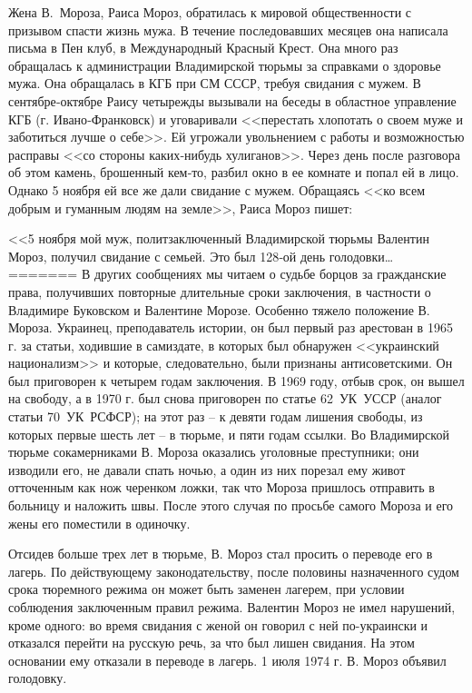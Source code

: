 \documentclass{book}
\begin{document}
Жена В.~Мороза, Раиса Мороз, обратилась к мировой общественности с призывом спасти жизнь мужа. В течение последовавших месяцев она написала письма в Пен клуб, в Международный Красный Крест. Она много раз обращалась к администрации Владимирской тюрьмы за справками о здоровье мужа. Она обращалась в КГБ при СМ СССР, требуя свидания с мужем. В сентябре‑октябре Раису четырежды вызывали на бесе­ды в областное управление КГБ (г. Ивано‑Франковск) и уговаривали <<перестать хлопотать о своем муже и заботиться лучше о себе>>. Ей угрожали увольнением с работы и возможностью расправы <<со стороны каких‑нибудь хулиганов>>. Через день после разговора об этом камень, брошенный кем‑то, разбил окно в ее комнате и попал ей в лицо. Однако 5 ноября ей все же дали свидание с мужем. Обращаясь <<ко всем добрым и гуманным людям на земле>>, Раиса Мороз пишет:

<<5 ноября мой муж, политзаключенный Владимирской тюрьмы Валентин Мороз, получил свидание с семьей. Это был 128‑ой день голодовки\ldots
=======
В других сообщениях мы читаем о судьбе борцов за гражданские права, получивших повторные длительные сроки заключения, в частности о Владимире Буковском и Валентине Морозе. Особенно тяжело положение В. Мороза. Украинец, преподаватель истории, он был первый раз арестован в 1965 г. за статьи, ходившие в самиздате, в которых был обнаружен <<украинский национализм>> и которые, следовательно, были признаны антисоветскими. Он был приговорен к четырем годам заключения. В 1969 году, отбыв срок, он вышел на свободу, а в 1970 г. был снова приговорен по статье 62~УК~УССР (аналог статьи 70~УК~РСФСР); на этот раз -- к девяти годам лишения свободы, из которых первые шесть лет -- в тюрьме, и пяти годам ссылки. Во Владимирской тюрьме сокамерниками В. Мо­роза оказались уголовные преступники; они изводили его, не давали спать ночью, а один из них порезал ему живот отточенным как нож черенком ложки, так что Мороза пришлось отпра­вить в больницу и наложить швы. После этого случая по просьбе самого Мороза и его жены его поместили в 
одиночку.

Отсидев больше трех лет в тюрьме, В. Мороз стал просить о переводе его в лагерь. По действующему законодательству, после половины назначенного судом срока тюремного режима он может быть заменен лагерем, при условии соблюдения заключенным правил режима. Валентин Мороз не имел нарушений, кроме одного: во время свидания с женой он говорил с ней по-украински и отказался перейти на русскую речь, за что был лишен свидания. На этом основании ему отказали в переводе в лагерь. 1 июля 1974 г. В. Мороз объявил голодовку.
\end{document}
